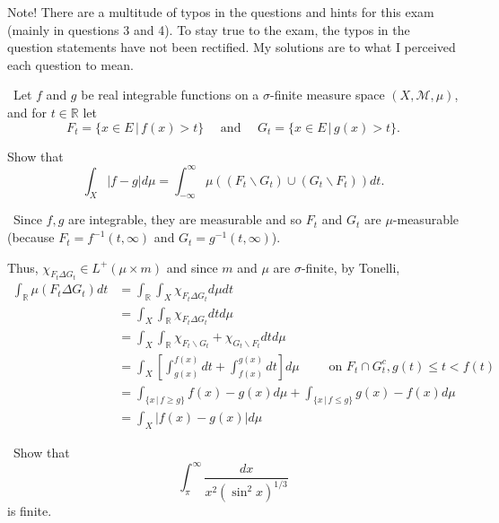 \documentclass[12pt]{Qual}
\begin{document}
\begin{framed}{\large{Note! There are a multitude of typos in the questions and hints for this exam (mainly in questions 3 and 4). To stay true to the exam, the typos in the question statements have not been rectified. My solutions are to what I perceived each question to mean.}}
\end{framed}

\begin{problem} $\,$
Let $f$ and $g$ be real integrable functions on a $\sigma$-finite measure space $(X,\mathscr{M},\mu)$, and for $t\in\mathbb{R}$ let $$F_t=\{x\in E\,|\,f(x)>t\}\quad\text{ and }\quad G_t=\{x\in E\,|\,g(x)>t\}.$$

Show that $$\int_X|f-g|d\mu=\int_{-\infty}^\infty\mu((F_t\backslash G_t)\cup(G_t\backslash F_t))dt.$$
\end{problem}


\begin{solution}$\,$
Since $f,g$ are integrable, they are measurable and so $F_t$ and $G_t$ are $\mu$-measurable (because $F_t=f^{-1}(t,\infty)$ and $G_t=g^{-1}(t,\infty)$).

Thus, $\chi_{F_t\Delta G_t}\in L^+(\mu\times m)$ and since $m$ and $\mu$ are $\sigma$-finite, by Tonelli,
\begin{align*}
    \int_\mathbb{R}\mu(F_t\Delta G_t)dt&=\int_\mathbb{R}\int_X\chi_{F_t\Delta G_t}d\mu dt\\
    &=\int_X\int_\mathbb{R}\chi_{F_t\Delta G_t}dtd\mu\\
    &=\int_X\int_\mathbb{R}\chi_{F_t\backslash G_t}+\chi_{G_t\backslash F_t}dtd\mu\\
    &=\int_X\left[\int_{g(x)}^{f(x)}dt+\int_{f(x)}^{g(x)}dt\right]d\mu\qquad\text{ on }F_t\cap G_t^c, g(t)\le t<f(t)\\
    &=\int_{\{x\,|\,f\ge g\}}f(x)-g(x)d\mu+\int_{\{x\,|\,f\le g\}}g(x)-f(x)d\mu\\
    &=\int_X|f(x)-g(x)|d\mu
\end{align*}
\end{solution}
\newpage

\begin{problem} $\,$
Show that $$\int_\pi^\infty\frac{dx}{x^2(\sin^2x)^{1/3}}$$ is finite.
\end{problem}
\end{document}
